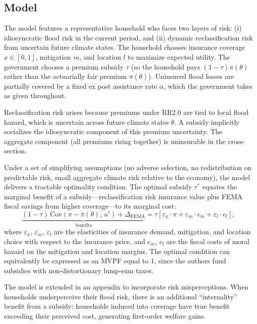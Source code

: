 \documentclass[12pt]{article}
\begin{document}
\subsection{Model}

The model features a representative household who faces two layers of risk: (i) idiosyncratic flood risk in the current period, and (ii) dynamic reclassification risk from uncertain future climate states. The household chooses insurance coverage $x \in [0,1]$, mitigation $m$, and location $l$ to maximize expected utility. The government chooses a premium subsidy $\tau$ (so the household pays $(1-\tau)\pi(\theta)$ rather than the actuarially fair premium $\pi(\theta)$). Uninsured flood losses are partially covered by a fixed ex post assistance rate $\alpha$, which the government takes as given throughout.

Reclassification risk arises because premiums under RR2.0 are tied to local flood hazard, which is uncertain across future climate states $\theta$. A subsidy implicitly socializes the idiosyncratic component of this premium uncertainty. The aggregate component (all premiums rising together) is uninsurable in the cross-section.

Under a set of simplifying assumptions (no adverse selection, no redistribution on predictable risk, small aggregate climate risk relative to the economy), the model delivers a tractable optimality condition. The optimal subsidy $\tau^*$ equates the marginal benefit of a subsidy---reclassification risk insurance value plus FEMA fiscal savings from higher coverage---to its marginal cost:
\[
    \underbrace{(1-\tau)\,\mathrm{Cov}(\pi - \bar\pi(\theta),\, u')
    + \Delta_\mathrm{FEMA}}_{\text{benefits}}
    =
    \tau\!\left[\varepsilon_x \cdot \pi + \varepsilon_m \cdot c_m + \varepsilon_l \cdot c_l\right],
\]
where $\varepsilon_x$, $\varepsilon_m$, $\varepsilon_l$ are the elasticities of insurance demand, mitigation, and location choice with respect to the insurance price, and $c_m$, $c_l$ are the fiscal costs of moral hazard on the mitigation and location margins. The optimal condition can equivalently be expressed as an MVPF equal to 1, since the authors fund subsidies with non-distortionary lump-sum taxes.

The model is extended in an appendix to incorporate risk misperceptions. When households underperceive their flood risk, there is an additional ``internality'' benefit from a subsidy: households induced into coverage have true benefit exceeding their perceived cost, generating first-order welfare gains.
\end{document}
